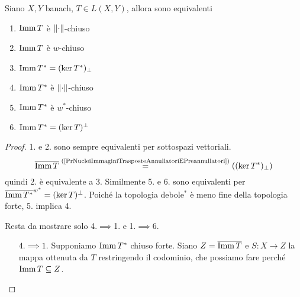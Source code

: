 \begin{theorem}\label{ThImmagineChiusa}
Siano $X,Y$ banach, $T\in L(X,Y)$, allora sono equivalenti
\begin{enumerate}
    \item $\imm T$ \`e $\normd$-chiuso
    \item $\imm T$ \`e $w$-chiuso
    \item $\imm T^\ast=(\ker T^\ast)_\perp$
    \item $\imm T^\ast$ \`e $\normd$-chiuso
    \item $\imm T^\ast$ \`e $w^\ast$-chiuso
    \item $\imm T^\ast=(\ker T)^\perp$
\end{enumerate}
\end{theorem}
\begin{proof}
1. e 2. sono sempre equivalenti per sottospazi vettoriali.
\[\ol{\imm T}\pasgnl={(\ref{PrNucleiImmaginiTrasposteAnnullatoriEPreannullatori})}((\ker T^\ast)_\perp)\]
quindi 2. \`e equivalente a 3. Similmente 5. e 6. sono equivalenti per $\ol{\imm T^\ast}^{w^\ast}=(\ker T)^\perp$. Poich\'e la topologia debole$^\ast$ \`e meno fine della topologia forte, 5. implica 4.

Resta da mostrare solo 4.$\implies$1. e 1.$\implies$6.
\setlength{\leftmargini}{0cm}
\begin{itemize}
\item[$\boxed{4.\implies1.}$] Supponiamo $\imm T^\ast$ chiuso forte. Siano $Z=\ol{\imm T}$ e $S:X\to Z$ la mappa ottenuta da $T$ restringendo il codominio, che possiamo fare perch\'e $\imm T\subseteq Z$.


\end{itemize}
\end{proof}
